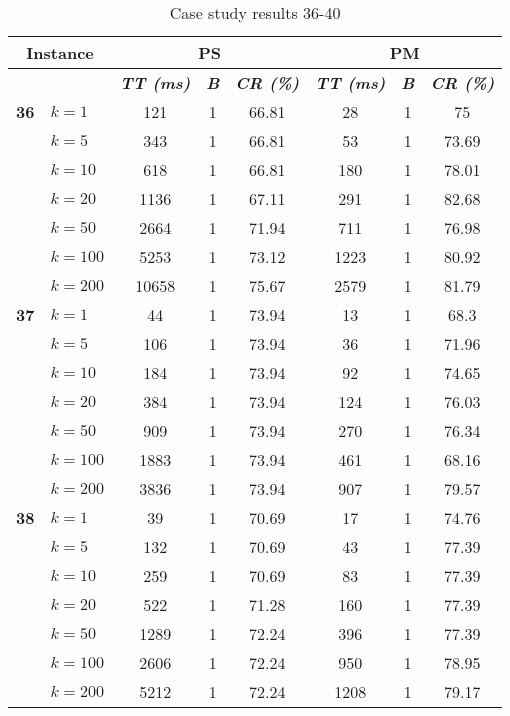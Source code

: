     \begin{table}[htbp]
    \caption{Case study results 36-40}
    \centering
    \begin{tabular}{|l|l|c|c|c|c|c|c|}
    \hline
    \multicolumn{ 2}{|c|}{\textbf{Instance}} & \multicolumn{ 3}{c|}{\textbf{PS}} & \multicolumn{ 3}{c|}{\textbf{PM}} \\ \hline
    \multicolumn{ 2}{|l|}{} & \textbf{\textit{TT (ms)}} & \textbf{\textit{B}} & \textbf{\textit{CR (\%)}} & \textbf{\textit{TT (ms)}} & \textbf{\textit{B}} & \textbf{\textit{CR (\%)}} \\ \hline
    \multicolumn{1}{|r|}{\textbf{36}} & $k=1$ & 121 & 1 & 66.81 & 28 & 1 & 75 \\ 
     & $k=5$ & 343 & 1 & 66.81 & 53 & 1 & 73.69 \\ 
     & $k=10$ & 618 & 1 & 66.81 & 180 & 1 & 78.01 \\ 
     & $k=20$ & 1136 & 1 & 67.11 & 291 & 1 & 82.68 \\ 
     & $k=50$ & 2664 & 1 & 71.94 & 711 & 1 & 76.98 \\ 
     & $k=100$ & 5253 & 1 & 73.12 & 1223 & 1 & 80.92 \\ 
     & $k=200$ & 10658 & 1 & 75.67 & 2579 & 1 & 81.79 \\ \hline
    \multicolumn{1}{|r|}{\textbf{37}} & $k=1$ & 44 & 1 & 73.94 & 13 & 1 & 68.3 \\ 
     & $k=5$ & 106 & 1 & 73.94 & 36 & 1 & 71.96 \\ 
     & $k=10$ & 184 & 1 & 73.94 & 92 & 1 & 74.65 \\ 
     & $k=20$ & 384 & 1 & 73.94 & 124 & 1 & 76.03 \\ 
     & $k=50$ & 909 & 1 & 73.94 & 270 & 1 & 76.34 \\ 
     & $k=100$ & 1883 & 1 & 73.94 & 461 & 1 & 68.16 \\ 
     & $k=200$ & 3836 & 1 & 73.94 & 907 & 1 & 79.57 \\ \hline
    \multicolumn{1}{|r|}{\textbf{38}} & $k=1$ & 39 & 1 & 70.69 & 17 & 1 & 74.76 \\ 
     & $k=5$ & 132 & 1 & 70.69 & 43 & 1 & 77.39 \\ 
     & $k=10$ & 259 & 1 & 70.69 & 83 & 1 & 77.39 \\ 
     & $k=20$ & 522 & 1 & 71.28 & 160 & 1 & 77.39 \\ 
     & $k=50$ & 1289 & 1 & 72.24 & 396 & 1 & 77.39 \\ 
     & $k=100$ & 2606 & 1 & 72.24 & 950 & 1 & 78.95 \\ 
     & $k=200$ & 5212 & 1 & 72.24 & 1208 & 1 & 79.17 \\ \hline

\end{tabular}
\end{table}
